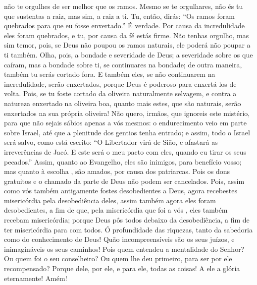 {não te orgulhes de ser melhor que os ramos. Mesmo se te orgulhares, não és tu que sustentas a raiz, mas sim, a raiz a ti.
Tu, então, dirás: “Os ramos foram quebrados para que eu fosse enxertado.”
É verdade. Por causa da incredulidade eles foram quebrados, e tu, por causa da fé estás firme. Não tenhas orgulho, mas sim temor,
pois, se Deus não poupou os ramos naturais, ele poderá não poupar a ti também.
Olha, pois, a bondade e severidade de Deus; a severidade sobre os que caíram, mas a bondade sobre ti, se continuares na bondade; de outra maneira, também tu serás cortado fora.
E também eles, se não continuarem na incredulidade, serão enxertados, porque Deus é poderoso para enxertá-los de volta.
Pois, se tu foste cortado da oliveira naturalmente selvagem, e contra a natureza enxertado na oliveira boa, quanto mais estes, que são naturais, serão enxertados na sua própria oliveira!
Não quero, irmãos, que ignoreis este mistério, para que não sejais sábios apenas a vós mesmos: o endurecimento veio em parte sobre Israel, até que a plenitude dos gentios tenha entrado;
e assim, todo o Israel será salvo, como está escrito: “O Libertador virá de Sião, e afastará as irreverências de Jacó.
E este será o meu pacto com eles, quando eu tirar os seus pecados.”
{}
Assim, quanto ao Evangelho, eles são inimigos, para benefício vosso;
 mas quanto à escolha
{} , são amados, por causa dos patriarcas.
Pois os dons gratuitos e o chamado da parte de Deus não podem ser cancelados.
Pois, assim como vós também antigamente fostes desobedientes a Deus, agora recebestes misericórdia pela desobediência deles,
assim também agora eles foram desobedientes, a fim de que, pela misericórdia que foi a vós
{} , eles também recebam misericórdia;
porque Deus pôs todos debaixo da desobediência, a fim de ter misericórdia para com todos.
Ó profundidade das riquezas, tanto da sabedoria como do conhecimento de Deus! Quão incompreensíveis são os seus juízos, e inimagináveis os seus caminhos!
Pois quem entendeu a mentalidade do Senhor? Ou quem foi o seu conselheiro?
Ou quem lhe deu primeiro, para ser por ele recompensado?
Porque dele, por ele, e para ele,
{} todas as coisas! A ele
{} a glória eternamente! Amém!

}
